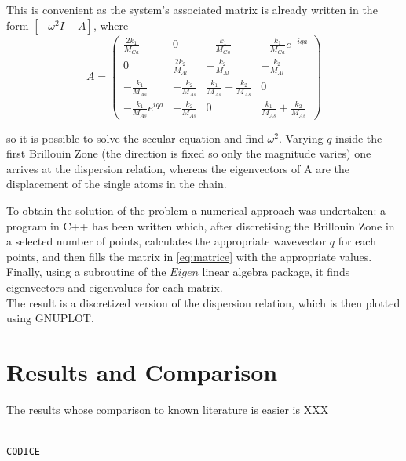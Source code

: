\documentclass{article}
\begin{document}
This is convenient as the system's associated matrix is already written in the form $[-\omega^2I + A]$, where
\begin{equation} 
A = \begin{pmatrix}
   \frac{2k_1}{M_{Ga}}	& 0  & -\frac{k_1}{M_{Ga}}  & -\frac{k_1}{M_{Ga}}e^{-iqa}  \\ 
   0	& \frac{2k_2}{M_{Al}}  & -\frac{k_2}{M_{Al}}  & -\frac{k_2}{M_{Al}}  \\ 
   -\frac{k_1}{M_{As}} 	& -\frac{k_2}{M_{As}}   & \frac{k_1}{M_{As}}+\frac{k_2}{M_{As}}   & 0  \\ 
   -\frac{k_1}{M_{As}}e^{iqa} 	& -\frac{k_2}{M_{As}}  & 0  & \frac{k_1}{M_{As}}+\frac{k_2}{M_{As}}   
\end{pmatrix} 
\label{eq:matrice}
\end{equation}


so it is possible to solve the secular equation and find $\omega^2$. Varying $q$ inside the first Brillouin Zone (the direction is fixed so only the magnitude varies) one arrives at the dispersion relation, whereas the eigenvectors of A are the displacement of the single atoms in the chain.\par
\medskip

To obtain the solution of the problem a numerical approach was undertaken: a program in C++ has been written which, after discretising the Brillouin Zone in a selected number of points, calculates the appropriate wavevector $q$ for each points, and then fills the matrix in \autoref{eq:matrice} with the appropriate values. Finally, using a subroutine of the $Eigen$ linear algebra package, it finds eigenvectors and eigenvalues for each matrix.\\
The result is a discretized version of the dispersion relation, which is then plotted using GNUPLOT.

\section{Results and Comparison}
The results whose comparison to known literature is easier is 
XXX
\begin{lstlisting}[language=C++, caption={Subroutine norma \\ \emph{maodulo.f90}}]

CODICE

\end{lstlisting} 


	
\end{document}
